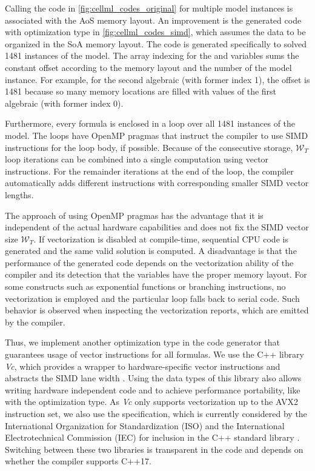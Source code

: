Calling the code in \cref{fig:cellml_codes_original} for multiple model instances is associated with the AoS memory layout.
An improvement is the generated code with optimization type  in \cref{fig:cellml_codes_simd}, which assumes the data to be organized in the SoA memory layout. The code is generated specifically to solved 1481 instances of the model. The array indexing for the  and  variables sums the constant offset according to the memory layout and the number of the model instance. For example, for the second algebraic (with former index 1), the offset is 1481 because so many memory locations are filled with values of the first algebraic (with former index 0).

Furthermore, every formula is enclosed in a loop over all 1481 instances of the model. The loops have OpenMP pragmas that instruct the compiler to use SIMD instructions for the loop body, if possible. Because of the consecutive storage, $\mathcal{W}_T$ loop iterations can be combined into a single computation using vector instructions. For the remainder iterations at the end of the loop, the compiler automatically adds different instructions with corresponding smaller SIMD vector lengths.

The approach of using OpenMP pragmas has the advantage that it is independent of the actual hardware capabilities and does not fix the SIMD vector size $\mathcal{W}_T$. If vectorization is disabled at compile-time, sequential CPU code is generated and the same valid solution is computed. A disadvantage is that the performance of the generated code depends on the vectorization ability of the compiler and its detection that the variables have the proper memory layout. For some constructs such as exponential functions or branching instructions, no vectorization is employed and the particular loop falls back to serial code. Such behavior is observed when inspecting the vectorization reports, which are emitted by the compiler.

Thus, we implement another optimization type  in the code generator that guarantees usage of vector instructions for all formulas. We use the C++ library \emph{Vc}, which provides a wrapper to hardware-specific vector instructions and abstracts the SIMD lane width \cite{vc2012,Kretz2015}. Using the data types of this library also allows writing hardware independent code and to achieve performance portability, like with the  optimization type. 
As \emph{Vc} only supports vectorization up to the AVX2 instruction set, we also use the  specification, which is currently considered by the International Organization for Standardization (ISO) and the International Electrotechnical Commission (IEC) for inclusion in the C++ standard library \cite{hoberock2016working}. Switching between these two libraries is transparent in the code and depends on whether the compiler supports C++17.

